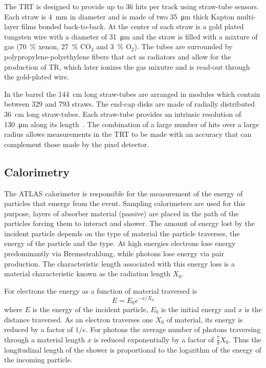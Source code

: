 The TRT is designed to provide up to \num{36} hits per track using straw-tube sensors. Each straw is \SI{4}{\mm} in diameter and is made of two \SI{35}{\micro\meter} thick Kapton multi-layer films bonded back-to-back. At the center of each straw is a gold plated tungsten wire with a diameter of \SI{31}{\micro\meter} and the straw is filled with a mixture of gas (\SI{70}{\percent} xenon, \SI{27}{\percent} $\textrm{CO}_{2}$ and \SI{3}{\percent} $\textrm{O}_2$). The tubes are surrounded by polypropylene-polyethylene fibers that act as radiators and allow for the production of TR, which later ionizes the gas mixutre and is read-out through the gold-plated wire.

In the barrel the \SI{144}{\cm} long straw-tubes are arranged in modules which contain between \num{329} and \num{793} straws. The end-cap disks are made of radially distributed \SI{36}{\cm} long straw-tubes. Each straw-tube provides an intrinsic resolution of \SI{130}{\um} along its length~\cite{Detector:ATLASExperimentGeneral}. The combination of a large number of hits over a large radius allows measurements in the TRT to be made with an accuracy that can complement those made by the pixel detector.

\subsection{Calorimetry}
The ATLAS calorimeter is responsible for the measurement of the energy of particles that emerge from the event. Sampling calorimeters are used for this purpose, layers of absorber material (passive) are placed in the path of the particles forcing them to interact and shower. The amount of energy lost by the incident particle depends on the type of material the particle traverses, the energy of the particle and the type. At high energies electrons lose energy predominantly via Bremsstrahlung, while photons lose energy via pair production. The characteristic length associated with this energy loss is a material characteristic known as the radiation length $X_0$.

For electrons the energy as a function of material traversed is 
%
\begin{equation}
  E=E_0e^{-x/X_0}
\end{equation}
%
where $E$ is the energy of the incident particle, $E_0$ is the initial energy and $x$ is the distance traversed. As an electron traverses one $X_0$ of material, its energy is reduced by a factor of $1/e$. For photons the average number of photons traversing through a material length $x$ is reduced exponentially by a factor of $\frac{7}{9}X_0$. Thus the longitudinal length of the shower is proportional to the logarithm of the energy of the incoming particle.

